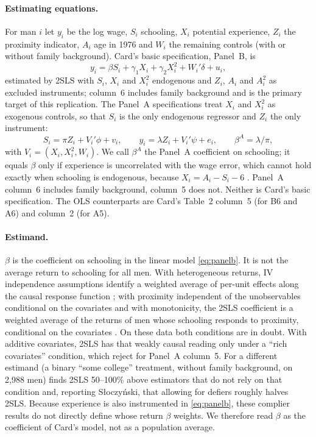\documentclass[11pt]{article}
\begin{document}
\paragraph{Estimating equations.} For man $i$ let $y_i$ be the log wage, $S_i$ schooling,
$X_i$ potential experience, $Z_i$ the proximity indicator, $A_i$ age in 1976 and $W_i$ the
remaining controls (with or without family background). Card's basic specification,
Panel~B, is
\begin{equation}
y_i = \beta S_i + \gamma_1 X_i + \gamma_2 X_i^2 + W_i'\delta + u_i, \label{eq:panelb}
\end{equation}
estimated by 2SLS with $S_i$, $X_i$ and $X_i^2$ endogenous and $Z_i$, $A_i$ and $A_i^2$ as
excluded instruments; column~6 includes family background and is the primary target of
this replication. The Panel~A specifications treat $X_i$ and $X_i^2$ as exogenous controls,
so that $S_i$ is the only endogenous regressor and $Z_i$ the only instrument:
\begin{equation}
S_i = \pi Z_i + V_i'\phi + v_i, \qquad
y_i = \lambda Z_i + V_i'\psi + e_i, \qquad
\beta^{A} = \lambda / \pi, \label{eq:panela}
\end{equation}
with $V_i = (X_i, X_i^2, W_i)$. We call $\beta^{A}$ the Panel~A coefficient on schooling;
it equals $\beta$ only if experience is uncorrelated with the wage error, which cannot hold
exactly when schooling is endogenous, because $X_i = A_i - S_i - 6$
\citep[p.~13]{card1993nber}. Panel~A column~6 includes family background, column~5 does
not. Neither is Card's basic specification. The OLS counterparts are Card's Table~2
column~5 (for B6 and A6) and column~2 (for A5).

\paragraph{Estimand.} $\beta$ is the coefficient on schooling in the linear model
\eqref{eq:panelb}. It is not the average return to schooling for all men. With
heterogeneous returns, IV independence assumptions identify a weighted average of per-unit
effects along the causal response function \citep{angrist1995twostage}; with proximity
independent of the unobservables conditional on the covariates and with monotonicity, the
2SLS coefficient is a weighted average of the returns of men whose schooling responds to
proximity, conditional on the covariates \citep{kling2001interpreting}. On these data both
conditions are in doubt. With additive covariates, 2SLS has that weakly causal reading
only under a ``rich covariates'' condition, which \citet{blandhol2025tsls} reject for
Panel~A column~5. For a different estimand (a binary ``some college'' treatment, without
family background, on 2,988 men) \citet{tubbicke2023when} finds 2SLS 50--100\% above
estimators that do not rely on that condition and, reporting S{\l}oczy{\'n}ski, that
allowing for defiers roughly halves 2SLS. Because experience is also instrumented in
\eqref{eq:panelb}, these complier results do not directly define whose return $\beta$
weights. We therefore read $\beta$ as the coefficient of Card's model, not as a population
average.
\end{document}

